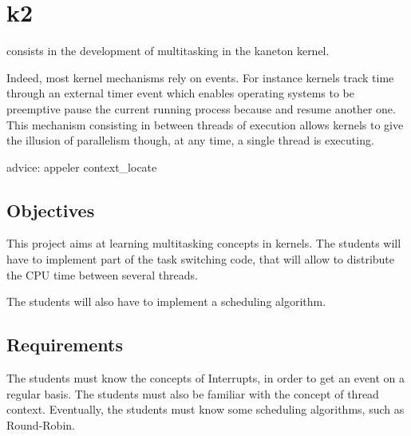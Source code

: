 %
%
%
%
%
%

%
%

\chapter{k2}
\label{chapter:k2}

 consists in the development of multitasking in the kaneton kernel.

Indeed, most kernel mechanisms rely on events. For instance kernels track
time through an external timer event which enables operating systems to be
preemptive \ie{} pause the current running process because and resume another
one. This mechanism consisting in  between threads
of execution allows kernels to give the illusion of parallelism though,
at any time, a single thread is executing.

advice:
  appeler context\_locate

\newpage

%
%

%
%

\section{Objectives}

This project aims at learning multitasking concepts in kernels. The students will have to implement part of the task switching code, that will allow to distribute the CPU time between several threads.

The students will also have to implement a scheduling algorithm.

%
%

\section{Requirements}

The students must know the concepts of Interrupts, in order to get an event on a regular basis. The students must also be familiar with the concept of thread context. Eventually, the students must know some scheduling algorithms, such as Round-Robin.


